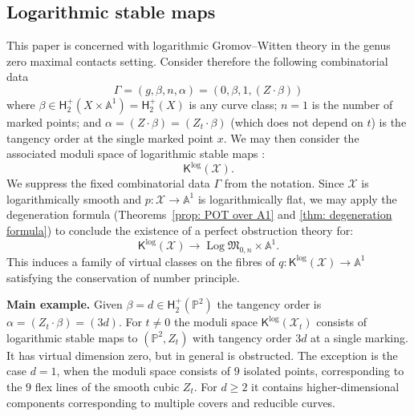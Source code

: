 \documentclass[11pt]{amsart}
\newcommand{\runningexample}{\noindent \textbf{Main example.} }
\theoremstyle{definition}
\theoremstyle{definition}
\newcommand{\Aaff}{\mathbb{A}}
\newcommand{\PP}{\mathbb{P}}
\newcommand{\Xcal}{\mathcal{X}}
\newcommand{\Mfrak}{\mathfrak{M}}
\newcommand{\Kup}{\mathsf{K}}
\newcommand{\Log}{\operatorname{Log}}
\begin{document}
\subsection{Logarithmic stable maps}\label{sec: logarithmic stable maps to Xcal} This paper is concerned with logarithmic Gromov--Witten theory in the genus zero maximal contacts setting. Consider therefore the following combinatorial data
\begin{equation*} \Gamma=(g,\beta,n,\alpha) = (0,\beta,1,(Z \cdot \beta)) \end{equation*}
where $\beta \in \mathsf{H}_2^+(X \times \Aaff^{\! 1}) = \mathsf{H}_2^+(X)$ is any curve class; $n=1$ is the number of marked points; and $\alpha=(Z \cdot \beta) = (Z_t \cdot \beta)$ (which does not depend on $t$) is the tangency order at the single marked point $x$. We may then consider the associated moduli space of logarithmic stable maps \cite{ChenLog,AbramovichChenLog,GrossSiebertLog}:
\begin{equation*} \Kup^{\log}(\Xcal).\end{equation*}
We suppress the fixed combinatorial data $\Gamma$ from the notation. Since $\Xcal$ is logarithmically smooth and $p \colon \Xcal \to \Aaff^{\! 1}$ is logarithmically flat, we may apply the degeneration formula (Theorems~\ref{prop: POT over A1} and \ref{thm: degeneration formula}) to conclude the existence of a perfect obstruction theory for:
\begin{equation*} \Kup^{\log}(\Xcal) \to \Log\Mfrak_{0,n}\times\Aaff^{\! 1}.\end{equation*}
This induces a family of virtual classes on the fibres of $q \colon \Kup^{\log}(\Xcal) \to \Aaff^{\! 1}$ satisfying the conservation of number principle.

\runningexample Given $\beta=d \in \mathsf{H}_2^+(\PP^2)$ the tangency order is $\alpha=(Z_t \cdot \beta) = (3d)$. For $t \neq 0$ the moduli space $\Kup^{\log}(\Xcal_t)$ consists of logarithmic stable maps to $(\PP^2,Z_t)$ with tangency order $3d$ at a single marking. It has virtual dimension zero, but in general is obstructed. The exception is the case $d=1$, when the moduli space consists of $9$ isolated points, corresponding to the $9$ flex lines of the smooth cubic $Z_t$. For $d \geq 2$ it contains higher-dimensional components corresponding to multiple covers and reducible curves.
\end{document}
